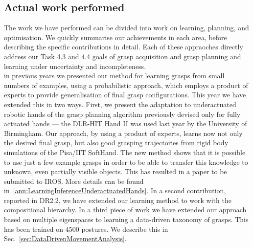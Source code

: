\documentclass[a4paper,11pt,pdf]{pacmanreport}
\begin{document}
\subsection{Actual work performed}

The work we have performed can be divided into work on learning, planning, and optimisation. We quickly summarise our achievements in each area, before describing the specific contributions in detail. Each of these appraoches directly address our Task 4.3 and 4.4 goals of grasp acquisition and grasp planning and learning under uncertainty and incompleteness.\\

 in previous years we presented our method for learning grasps from small numbers of examples, using a probabilistic approach, which employs a product of experts to provide generalisation of final grasp configurations. This year we have extended this in two ways. First, we present the adaptation to underactuated robotic hands of the grasp planning algorithm previously devised only for fully actuated hands --- the DLR-HIT Hand II was used last year by the University of Birmingham. Our approach, by using a product of experts, learns now not only the desired final grasp, but also good grasping trajectories from rigid body simulations of the Pisa/IIT SoftHand. The new method shows that it is possible to use just a few example grasps in order to be able to transfer this knowledge to unknown, even partially visible objects. This has resulted in a paper to be submitted to IROS. More details can be found in~\ref{ann:LearningInferenceUnderactuatedHands}.  In a second contribution, reported in DR2.2, we have extended our learning method to work with the compositional hierarchy.  In a third piece of work we have extended our approach based on multiple eigenspaces to learning a data-driven taxonomy of grasps. This has been trained on 4500 postures. We describe this in Sec.~\ref{sec:DataDrivenMovementAnalysis}. \\
\end{document}
